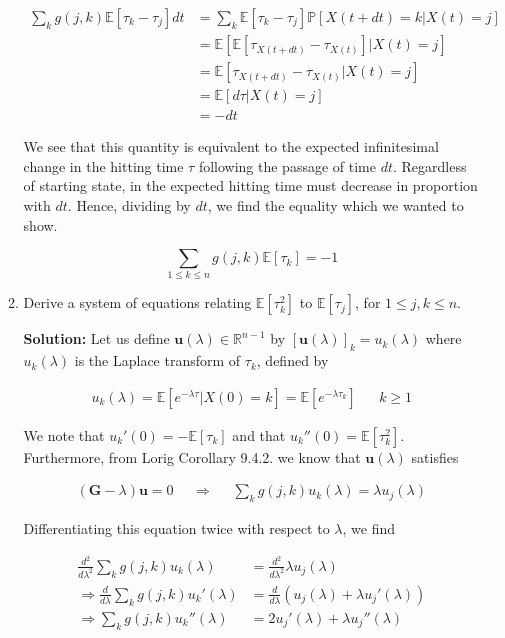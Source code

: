 \documentclass[12pt, a4paper]{article}
\begin{document}
\begin{enumerate}
\begin{enumerate}
        \begin{align*}
            \sum_{k} g(j,k) \mathbb E [\tau_k-\tau_j]dt &= \sum_{k}  \mathbb E [\tau_k-\tau_j] \mathbb P \left[X(t+dt) = k|X(t)=j \right] \\
            &= \mathbb E[\mathbb E[\tau_{X(t+dt)}-\tau_{X(t)}]|X(t)=j] \\
            &= \mathbb E[\tau_{X(t+dt)}-\tau_{X(t)}|X(t)=j] \\
            &= \mathbb E[d\tau|X(t)=j] \\&= -dt
        \end{align*}

        We see that this quantity is equivalent to the expected infinitesimal change in the hitting time $\tau$ following the passage of time $dt$. Regardless of starting state, in the expected hitting time must decrease in proportion with $dt$. Hence, dividing by $dt$, we find the equality which we wanted to show.

        $$\sum_{1 \le k \le n} g(j,k) \mathbb E [\tau_k]=-1$$

        \item Derive a system of equations relating $\mathbb E[\tau_k^2]$ to $\mathbb E[\tau_j]$, for $1 \le j,k \le n$. 

        \textbf{Solution:} Let us define $\mathbf u(\lambda) \in \mathbb R^{n-1}$ by $[\mathbf u(\lambda)]_k = u_k(\lambda)$ where $u_k(\lambda)$ is the Laplace transform of $\tau_k$, defined by

        \begin{align*}
            u_k(\lambda) =  \mathbb E \left[ e^{-\lambda \tau} |X(0)=k \right] = \mathbb E [e^{-\lambda \tau_k}] && k \ge 1
        \end{align*}

        We note that $u_k'(0)=-\mathbb E[\tau_k]$ and that $u_k''(0) = \mathbb E[\tau_k^2]$. Furthermore, from Lorig Corollary 9.4.2. we know that $\mathbf u(\lambda)$ satisfies 

        \begin{align*}
            (\mathbf G - \lambda) \mathbf u = 0 && \Rightarrow && \sum_{k} g(j,k) u_k(\lambda) = \lambda u_j(\lambda)
        \end{align*}

        Differentiating this equation twice with respect to $\lambda$, we find 

        \begin{align*}
            \frac{d^2}{d\lambda^2}\sum_k g(j,k) u_k(\lambda) &= \frac{d^2}{d\lambda^2} \lambda u_j(\lambda) \\
            \Rightarrow \frac{d}{d\lambda} \sum_k g(j,k) u_k'(\lambda) &= \frac{d}{d\lambda} (u_j(\lambda) + \lambda u_j'(\lambda))\\
            \Rightarrow \sum_k g(j,k) u_k''(\lambda) &= 2 u_j'(\lambda) + \lambda u_j''(\lambda)
        \end{align*}


\end{enumerate}
\end{enumerate}
\end{document}
